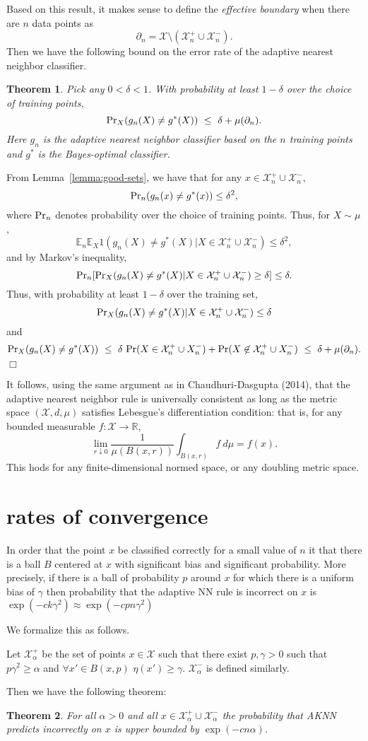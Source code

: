 \documentclass{article}
\def\R{{\mathbb{R}}}
\def\pr{{\rm Pr}}
\def\E{{\mathbb E}}
\def\X{{\mathcal X}}
\newtheorem{thm}{Theorem}
\newenvironment{proof}{\noindent {\sc Proof:}}{$\Box$ \medskip}
\begin{document}
Based on this result, it makes sense to define the {\it effective boundary} when there are $n$ data points as 
$$ \partial_n = \X \setminus (\X^+_n \cup \X^-_n) .$$
Then we have the following bound on the error rate of the adaptive nearest neighbor classifier.
\begin{thm}
Pick any $0 < \delta < 1$. With probability at least $1-\delta$ over the choice of training points,
$$ \pr_{X}(g_n(X) \neq g^*(X)) \ \leq \ \delta + \mu(\partial_n) .$$
Here $g_n$ is the adaptive nearest neighbor classifier based on the $n$ training points and $g^*$ is the Bayes-optimal classifier. 
\label{thm:general-error-bound}
\end{thm}
\begin{proof}
From Lemma~\ref{lemma:good-sets}, we have that for any $x \in \X^+_n \cup \X^-_n$, 
$$ \pr_n(g_n(x) \neq g^*(x)) \leq \delta^2 ,$$
where $\pr_n$ denotes probability over the choice of training points. Thus, for $X \sim \mu$,
$$ \E_n \E_X 1(g_n(X) \neq g^*(X) | X \in \X^+_n \cup \X^-_n) \leq \delta^2 ,$$
and by Markov's inequality,
$$ \pr_n [\pr_X (g_n(X) \neq g^*(X) |  X \in \X^+_n \cup \X^-_n) \geq \delta] \leq \delta.$$
Thus, with probability at least $1-\delta$ over the training set,
$$\pr_X (g_n(X) \neq g^*(X) |  X \in \X^+_n \cup \X^-_n) \leq \delta$$
and
$$ \pr_X(g_n(X) \neq g^*(X)) 
\ \leq \ \delta \ \pr(X \in \X^+_n \cup X^-_n) + \pr(X \not\in \X^+_n \cup X^-_n)
\ \leq \ \delta + \mu(\partial_n) .$$
\end{proof}

It follows, using the same argument as in Chaudhuri-Dasgupta (2014), that the adaptive nearest neighbor rule is universally consistent as long as the metric space $(\X, d, \mu)$ satisfies Lebesgue's differentiation condition: that is, for any bounded measurable $f: \X \rightarrow \R$,
$$ \lim_{r \downarrow 0} \frac{1}{\mu(B(x,r))} \int_{B(x,r)} f \ d\mu = f(x) .$$
This hods for any finite-dimensional normed space, or any doubling metric space.

\section{rates of convergence}

In order that the point $x$ be classified correctly for a small value of $n$ it that there is a ball $B$ centered at $x$ with significant bias and significant probability. More precisely, if there is a ball of probability $p$ around $x$ for which there is a uniform bias of $\gamma$ then probability that the adaptive NN rule is incorrect 
on $x$ is $\exp(-c k \gamma^2) \approx \exp(-c p n \gamma^2)$

We formalize this as follows.

Let $\X_{\alpha}^+$ be the set of points $x \in \X$ such that there exist $p,\gamma>0$ such that $p \gamma^2 \geq \alpha$ and  $\forall x' \in B(x,p)$ $\eta(x')\geq \gamma$. $\X_{\alpha}^-$ is defined similarly.

Then we have the following theorem:
\begin{thm}
For all $\alpha>0$ and all $x \in \X_{\alpha}^+ \cup \X_{\alpha}^-$ the probability that AKNN predicts incorrectly on $x$ is upper bounded by $\exp(-c n \alpha)$.
\end{thm}
\end{document}

